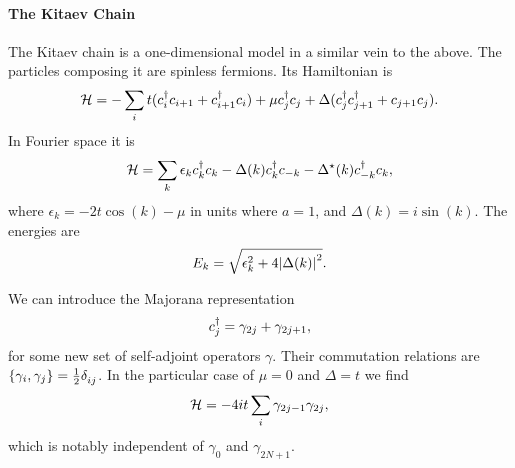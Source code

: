\paragraph{The Kitaev Chain}
The Kitaev chain is a one-dimensional model in a similar vein to the above. The particles composing it are spinless fermions. Its Hamiltonian is
\begin{align*}
	\mathcal{H} = -\sum\limits_{i}t(c_{i}^{\dagger} c_{i + 1} + c_{i + 1}^{\dagger} c_{i}) + \mu c_{j}^{\dagger} c_{j} + \Delta(c_{j}^{\dagger} c_{j + 1}^{\dagger} + c_{j + 1}c_{j}).
\end{align*}
In Fourier space it is
\begin{align*}
	\mathcal{H} = \sum\limits_{k}\epsilon_{k}c_{k}^{\dagger} c_{k} - \Delta(k)c_{k}^{\dagger} c_{-k} - \Delta^{\star}(k)c_{-k}^{\dagger} c_{k},
\end{align*}
where $\epsilon_{k} = -2t\cos(k) - \mu$ in units where $a = 1$, and $\Delta(k) = i\sin(k)$. The energies are
\begin{align*}
	E_{k} = \sqrt{\epsilon_{k}^{2} + 4\abs{\Delta(k)}^{2}}.
\end{align*}

We can introduce the Majorana representation
\begin{align*}
	c_{j}^{\dagger} = \gamma_{2j} + \gamma_{2j + 1},
\end{align*}
for some new set of self-adjoint operators $\gamma$. Their commutation relations are $\acomm{\gamma_{i}}{\gamma_{j}} = \frac{1}{2}\kdelta{}{ij}$. In the particular case of $\mu = 0$ and $\Delta = t$ we find
\begin{align*}
	\mathcal{H} = -4it\sum\limits_{i}\gamma_{2j - 1}\gamma_{2j},
\end{align*}
which is notably independent of $\gamma_{0}$ and $\gamma_{2N + 1}$.